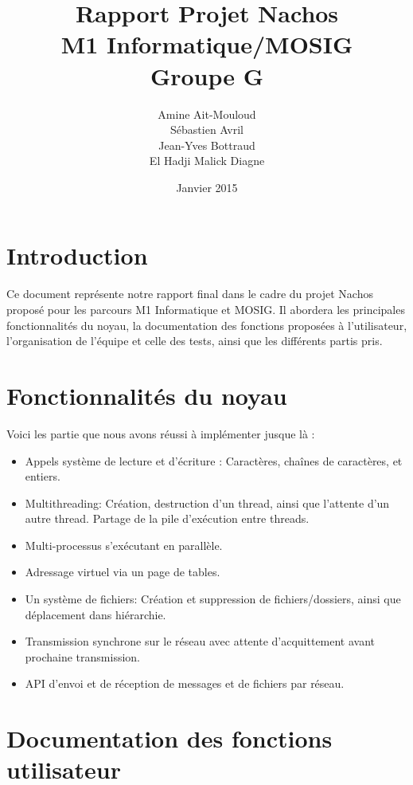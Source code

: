 \documentclass{article}
\title {\vspace*{\fill}Rapport Projet Nachos \\ M1 Informatique/MOSIG \\ Groupe G}
\author{Amine Ait-Mouloud\\ Sébastien Avril\\ Jean-Yves Bottraud\\ El Hadji Malick Diagne}
\date{Janvier 2015\vspace*{\fill}}
\begin{document}
\maketitle

\newpage
\tableofcontents
\newpage
\section{Introduction}
	Ce document représente notre rapport final dans le cadre du projet Nachos proposé pour les parcours M1 Informatique et MOSIG.
	Il abordera les principales fonctionnalités du noyau, la documentation des fonctions proposées à l'utilisateur, l'organisation de l'équipe et celle des tests, ainsi que les différents partis pris.

\section{Fonctionnalités du noyau}
	Voici les partie que nous avons réussi à implémenter jusque là :
	\begin{itemize}
		\item Appels système de lecture et d'écriture : Caractères, chaînes de caractères, et entiers.
		\item Multithreading: Création, destruction d'un thread, ainsi que l'attente d'un autre thread. Partage de la pile d'exécution entre threads.
		\item Multi-processus s'exécutant en parallèle. 
		\item Adressage virtuel via un page de tables.
		\item Un système de fichiers: Création et suppression de fichiers/dossiers, ainsi que déplacement dans hiérarchie.
		\item Transmission synchrone sur le réseau avec attente d'acquittement avant prochaine transmission.
		\item API d'envoi et de réception de messages et de fichiers par réseau. 
	\end{itemize}

\section{Documentation des fonctions utilisateur}
\end{document}
